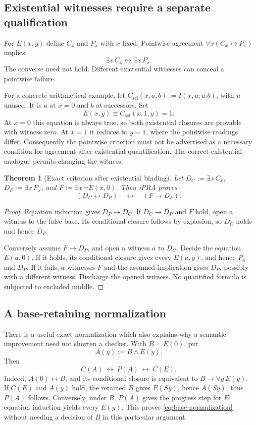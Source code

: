 \documentclass[11pt,letterpaper]{article}
\newtheorem{theorem}{Theorem}[section]
\theoremstyle{definition}
\theoremstyle{remark}
\begin{document}
\subsection{Existential witnesses require a separate qualification}

For $E(x,y)$ define $C_x$ and $P_x$ with $x$ fixed. Pointwise agreement
$\forall x(C_x\leftrightarrow P_x)$ implies
\[
                    \exists x\,C_x\leftrightarrow\exists x\,P_x.
\]
The converse need not hold. Different existential witnesses can conceal
a pointwise failure.

For a concrete arithmetical example, let
$C_{\mathrm{sel}}(x,a,b):=I(x,a;u.b)$, with $u$ unused. It is $a$ at
$x=0$ and $b$ at successors. Set
\[
              E(x,y)\equiv C_{\mathrm{sel}}(x,1,y)=1.
\]
At $x=0$ this equation is always true, so both existential closures are
provable with witness zero. At $x=1$ it reduces to $y=1$, where the
pointwise readings differ. Consequently the pointwise criterion must not
be advertised as a necessary condition for agreement after existential
quantification. The correct existential analogue permits changing the
witness:

\begin{theorem}[Exact criterion after existential binding]
Let $D_C:=\exists x\,C_x$, $D_P:=\exists x\,P_x$, and
$F:=\exists x\,\neg E(x,0)$. Then iPRA proves
\[
              (D_C\leftrightarrow D_P)
              \quad\leftrightarrow\quad(F\to D_P).
\]
\end{theorem}
\begin{proof}
Equation induction gives $D_P\to D_C$. If $D_C\to D_P$ and $F$
hold, open a witness to the false base. Its conditional closure follows
by explosion, so $D_C$ holds and hence $D_P$.

Conversely assume $F\to D_P$, and open a witness $a$ to $D_C$.
Decide the equation $E(a,0)$. If it holds, its conditional closure gives
every $E(a,y)$, and hence $P_a$ and $D_P$. If it fails, $a$ witnesses
$F$ and the assumed implication gives $D_P$, possibly with a different
witness. Discharge the opened witness. No quantified formula is subjected
to excluded middle.
\end{proof}

\subsection{A base-retaining normalization}

There is a useful exact normalization which also explains why a semantic
improvement need not shorten a checker. With $B=E(0)$, put
\[
                         A(y):=B\wedge E(y).
\]
Then
\begin{equation}
             C(A)\ \leftrightarrow\ P(A)\ \leftrightarrow\ C(E).
             \label{eq:base-normalization}
\end{equation}
Indeed, $A(0)\leftrightarrow B$, and its conditional closure is
equivalent to $B\to\forall y\,E(y)$. If $C(E)$ and $A(y)$ hold,
the retained $B$ gives $E(Sy)$, hence $A(Sy)$; thus $P(A)$ follows.
Conversely, under $B$, $P(A)$ gives the progress step for $E$; equation
induction yields every $E(y)$. This proves \eqref{eq:base-normalization}
without needing a decision of $B$ in this particular argument.
\end{document}
